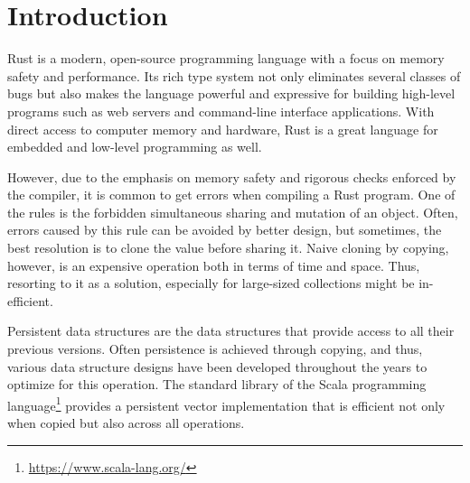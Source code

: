 

\chapter{Introduction}


Rust is a modern, open-source programming language with a focus on memory safety and performance. Its rich type system not only eliminates several classes of bugs but also makes the language powerful and expressive for building high-level programs such as web servers and command-line interface applications. With direct access to computer memory and hardware, Rust is a great language for embedded and low-level programming as well.

However, due to the emphasis on memory safety and rigorous checks enforced by the compiler, it is common to get errors when compiling a Rust program. One of the rules is the forbidden simultaneous sharing and mutation of an object. Often, errors caused by this rule can be avoided by better design, but sometimes, the best resolution is to clone the value before sharing it. Naive cloning by copying, however, is an expensive operation both in terms of time and space. Thus, resorting to it as a solution, especially for large-sized collections might be in-efficient.

Persistent data structures are the data structures that provide access to all their previous versions. Often persistence is achieved through copying, and thus, various data structure designs have been developed throughout the years to optimize for this operation. The standard library of the Scala programming language\footnote{\url{https://www.scala-lang.org/}} provides a persistent vector implementation that is efficient not only when copied but also across all operations.

